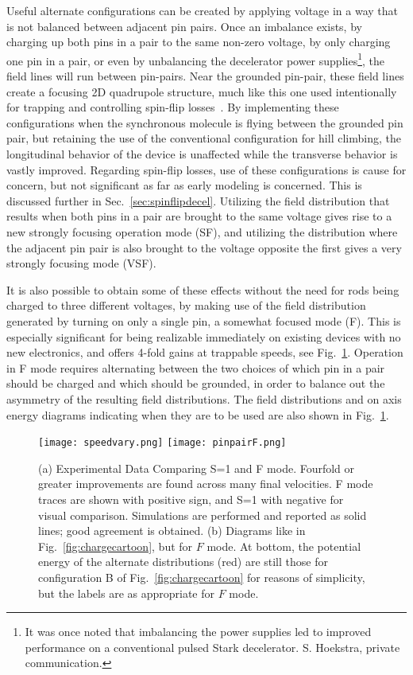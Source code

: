 Useful alternate configurations can be created by applying voltage in a way that is not balanced between adjacent pin pairs. 
Once an imbalance exists, by charging up both pins in a pair to the same non-zero voltage, by only charging one pin in a pair, or even by unbalancing the decelerator power supplies\footnote{It was once noted that imbalancing the power supplies led to improved performance on a conventional pulsed Stark decelerator. S. Hoekstra, private communication.}, the field lines will run between pin-pairs. 
Near the grounded pin-pair, these field lines create a focusing 2D quadrupole structure, much like this one used intentionally for trapping and controlling spin-flip losses~\cite{Reens2017}. 
By implementing these configurations when the synchronous molecule is flying between the grounded pin pair, but retaining the use of the conventional configuration for hill climbing, the longitudinal behavior of the device is unaffected while the transverse behavior is vastly improved.
Regarding spin-flip losses, use of these configurations is cause for concern, but not significant as far as early modeling is concerned. This is discussed further in Sec.~\ref{sec:spinflipdecel}.
Utilizing the field distribution that results when both pins in a pair are brought to the same voltage gives rise to a new strongly focusing operation mode (SF), and utilizing the distribution where the adjacent pin pair is also brought to the voltage opposite the first gives a very strongly focusing mode (VSF). 

It is also possible to obtain some of these effects without the need for rods being charged to three different voltages, by making use of the field distribution generated by turning on only a single pin, a somewhat focused mode (F).
This is especially significant for being realizable immediately on existing devices with no new electronics, and offers 4-fold gains at trappable speeds, see Fig.~\ref{fig:speedvary}.
Operation in F mode requires alternating between the two choices of which pin in a pair should be charged and which should be grounded, in order to balance out the asymmetry of the resulting field distributions.
The field distributions and on axis energy diagrams indicating when they are to be used are also shown in Fig.~\ref{fig:speedvary}.

\begin{figure}[t!]
\centering
\texttt{[image: speedvary.png]}\hspace{4mm}
\texttt{[image: pinpairF.png]}%
\caption[S=1 and F Mode Comparison]{\label{fig:speedvary}
(a) Experimental Data Comparing S=1 and F mode. Fourfold or greater improvements are found across many final velocities. F mode traces are shown with positive sign, and S=1 with negative for visual comparison. Simulations are performed and reported as solid lines; good agreement is obtained.
(b) Diagrams like in Fig.~\ref{fig:chargecartoon}, but for $F$ mode. At bottom, the potential energy of the alternate distributions (red) are still those for configuration B of Fig.~\ref{fig:chargecartoon} for reasons of simplicity, but the labels are as appropriate for $F$ mode.
}
\end{figure}

